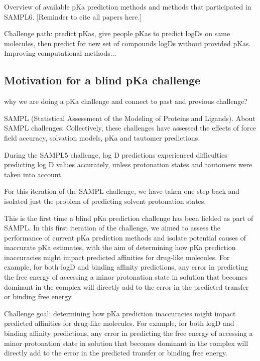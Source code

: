 \documentclass[9pt,lineno,final]{elife}
\begin{document}
Overview of available pKa prediction methods and methods that participated in SAMPL6. [Reminder to cite all papers here.]

Challenge path: predict pKas, give people pKas to predict logDs on same molecules, then predict for new set of compounds logDs without provided pKas.
Improving computational methods...


\subsection{Motivation for a blind pKa challenge}

why we are doing a pKa challenge and connect to past and previous challenge?

SAMPL (Statistical Assessment of the Modeling of Proteins and Ligands). About SAMPL challenges: Collectively, these challenges have assessed the effects of force field accuracy, solvation models, pKa and tautomer predictions.  

During the SAMPL5 challenge, log D predictions experienced difficulties predicting log D values accurately, unless protonation states and tautomers were taken into account.

For this iteration of the SAMPL challenge, we have taken one step back and isolated just the problem of predicting solvent protonation states.

This is the first time a blind pKa prediction challenge has been fielded as part of SAMPL. 
In this first iteration of the challenge, we aimed to assess the performance of current pKa prediction methods and isolate potential causes of inaccurate pKa estimates, with the aim of determining how pKa prediction inaccuracies might impact predicted affinities for drug-like molecules. 
For example, for both logD and binding affinity predictions, any error in predicting the free energy of accessing a minor protonation state in solution that becomes dominant in the complex will directly add to the error in the predicted transfer or binding free energy. 

Challenge goal: determining how pKa prediction inaccuracies might impact predicted affinities for drug-like molecules. For example, for both logD and binding affinity predictions, any error in predicting the free energy of accessing a minor protonation state in solution that becomes dominant in the complex will directly add to the error in the predicted transfer or binding free energy. 
\end{document}
